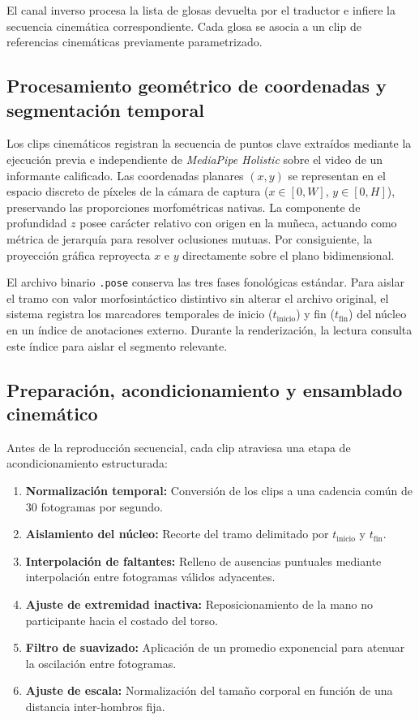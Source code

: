 El canal inverso procesa la lista de glosas devuelta por el traductor e infiere la secuencia cinemática correspondiente. Cada glosa se asocia a un clip de referencias cinemáticas previamente parametrizado.

\subsection{Procesamiento geométrico de coordenadas y segmentación temporal}
Los clips cinemáticos registran la secuencia de puntos clave extraídos mediante la ejecución previa e independiente de \textit{MediaPipe Holistic} sobre el video de un informante calificado. Las coordenadas planares $(x, y)$ se representan en el espacio discreto de píxeles de la cámara de captura ($x \in [0, W]$, $y \in [0, H]$), preservando las proporciones morfométricas nativas. La componente de profundidad $z$ posee carácter relativo con origen en la muñeca, actuando como métrica de jerarquía para resolver oclusiones mutuas. Por consiguiente, la proyección gráfica reproyecta $x$ e $y$ directamente sobre el plano bidimensional.

El archivo binario \texttt{.pose} conserva las tres fases fonológicas estándar. Para aislar el tramo con valor morfosintáctico distintivo sin alterar el archivo original, el sistema registra los marcadores temporales de inicio ($t_{\text{inicio}}$) y fin ($t_{\text{fin}}$) del núcleo en un índice de anotaciones externo. Durante la renderización, la lectura consulta este índice para aislar el segmento relevante.

\subsection{Preparación, acondicionamiento y ensamblado cinemático}
Antes de la reproducción secuencial, cada clip atraviesa una etapa de acondicionamiento estructurada:
\begin{enumerate}
    \item \textbf{Normalización temporal:} Conversión de los clips a una cadencia común de 30 fotogramas por segundo.
    \item \textbf{Aislamiento del núcleo:} Recorte del tramo delimitado por $t_{\text{inicio}}$ y $t_{\text{fin}}$.
    \item \textbf{Interpolación de faltantes:} Relleno de ausencias puntuales mediante interpolación entre fotogramas válidos adyacentes.
    \item \textbf{Ajuste de extremidad inactiva:} Reposicionamiento de la mano no participante hacia el costado del torso.
    \item \textbf{Filtro de suavizado:} Aplicación de un promedio exponencial para atenuar la oscilación entre fotogramas.
    \item \textbf{Ajuste de escala:} Normalización del tamaño corporal en función de una distancia inter-hombros fija.
\end{enumerate}

